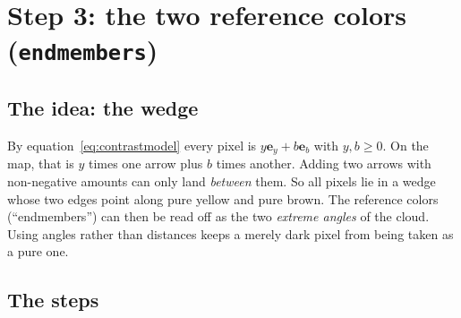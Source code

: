 \documentclass[11pt,letterpaper]{article}
\newcommand{\code}[1]{\texttt{#1}}
\newcommand{\ey}{\mathbf{e}_y}
\newcommand{\eb}{\mathbf{e}_b}
\newcommand{\src}[3]{%
  }
\begin{document}
\section{Step 3: the two reference colors (\code{endmembers})}
\label{sec:endmembers}

\subsection{The idea: the wedge}

By equation~\eqref{eq:contrastmodel} every pixel is $y\ey + b\eb$ with $y,b
\ge 0$.  On the map, that is $y$ times one arrow plus $b$ times another.
Adding two arrows with non-negative amounts can only land \emph{between}
them.  So all pixels lie in a wedge whose two edges point along pure yellow
and pure brown.  The reference colors (``endmembers'') can then be read off
as the two \emph{extreme angles} of the cloud.  Using angles rather than
distances keeps a merely dark pixel from being taken as a pure one.

\subsection{The steps}

\src{318}{340}{The body of \code{endmembers}.}
\end{document}
